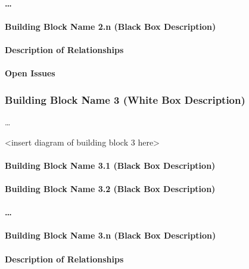 \documentclass[]{article}
\begin{document}
\paragraph{\ldots{}}

\paragraph{Building Block Name 2.n (Black Box Description)}

\paragraph{Description of Relationships}

\paragraph{Open Issues}

\subsubsection{Building Block Name 3 (White Box Description)}

\ldots{}

\textless{}insert diagram of building block 3 here\textgreater{}

\paragraph{Building Block Name 3.1 (Black Box Description)}

\paragraph{Building Block Name 3.2 (Black Box Description)}

\paragraph{\ldots{}}

\paragraph{Building Block Name 3.n (Black Box Description)}

\paragraph{Description of Relationships}
\end{document}
